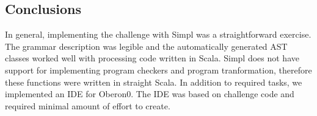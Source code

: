 \subsection{Conclusions}

In general, implementing the challenge with Simpl was a straightforward
exercise. The grammar description was legible and the automatically
generated AST classes worked well with processing code written in
Scala. Simpl does not have support for implementing program checkers
and program tranformation, therefore these functions were written
in straight Scala. In addition to required tasks, we implemented an
IDE for Oberon0. The IDE was based on challenge code and required
minimal amount of effort to create.

